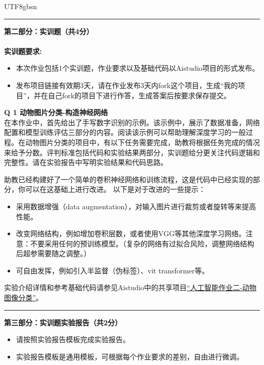 \documentclass[a4paper, 11pt]{article}
\newenvironment{problem}[2][Q]
    { \begin{mdframed}[backgroundcolor=gray!20] \textbf{#1 #2} \\}
    {  \end{mdframed}}
\begin{document}
\begin{CJK}{UTF8}{gbsn}
\newpage
\noindent\rule{7in}{1pt}
\textbf{第二部分：实训题（共4分）}
\\ \\
\textbf{实训题要求:}
\begin{itemize}
    \item 本次作业包括1个实训题，作业要求以及基础代码以Aistudio项目的形式发布。
    \item 发布项目链接有效期3天，请在作业发布3天内fork这个项目，生成``我的项目''，并在自己fork的项目下进行作答，生成答案后按要求保存提交。
\end{itemize}


\begin{problem}{1 动物图片分类-构造神经网络}

在本作业中，首先给出了手写数字识别的示例。该示例中，展示了数据准备，网络配置和模型训练评估三部分的内容。阅读该示例可以帮助理解深度学习的一般过程。在动物图片分类的项目中，有以下任务需要完成，助教将根据任务完成的情况来给予分数。评判标准包括代码和实验结果两部分，实训题给分更关注代码逻辑和完整性。请在实验报告中写明实验结果和代码思路。

助教已经构建好了一个简单的卷积神经网络和训练流程，这是代码中已经实现的部分，你可以在这基础上进行改进。
以下是对于改进的一些提示：

\begin{itemize}
    \item 采用数据增强（data augmentation），对输入图片进行裁剪或者旋转等来提高性能。
    \item 改变网络结构，例如增加卷积层数，或者使用VGG等其他深度学习网络。注意：不要采用任何的预训练模型。（复杂的网络有过拟合风险，调整网络结构后超参需要随之调整。）
    \item 可自由发挥，例如引入半监督（伪标签）、vit transformer等。
\end{itemize}


实验介绍详情和参考基础代码请参见Aistudio中的共享项目\href{https://aistudio.baidu.com/studio/project/partial/verify/7715706/5762c0421ac64a2695bc3c75f66df620}{“人工智能作业二-动物图像分类”}。

\end{problem}

\noindent\rule{7in}{1pt}
\textbf{第三部分：实训题实验报告（共2分）}
\begin{itemize}
    \item 请按照实验报告模板完成实验报告。
    \item 实验报告模板是通用模板，可根据每个作业要求的差别，自由进行微调。
\end{itemize}

\end{CJK}
\end{document}
